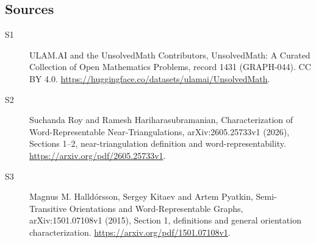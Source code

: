 \documentclass[11pt]{article}
\begin{document}
\subsection{Sources}
\begin{description}
\item[\hypertarget{source:1431:1}{S1}] ULAM.AI and the UnsolvedMath Contributors, UnsolvedMath: A Curated Collection of Open Mathematics Problems, record 1431 (GRAPH-044). CC BY 4.0. \url{https://huggingface.co/datasets/ulamai/UnsolvedMath}.
\item[\hypertarget{source:1431:2}{S2}] Suchanda Roy and Ramesh Hariharasubramanian, Characterization of Word-Representable Near-Triangulations, arXiv:2605.25733v1 (2026), Sections 1--2, near-triangulation definition and word-representability. \url{https://arxiv.org/pdf/2605.25733v1}.
\item[\hypertarget{source:1431:3}{S3}] Magnus M. Halldórsson, Sergey Kitaev and Artem Pyatkin, Semi-Transitive Orientations and Word-Representable Graphs, arXiv:1501.07108v1 (2015), Section 1, definitions and general orientation characterization. \url{https://arxiv.org/pdf/1501.07108v1}.
\end{description}
\label{end:1431}
\end{document}
